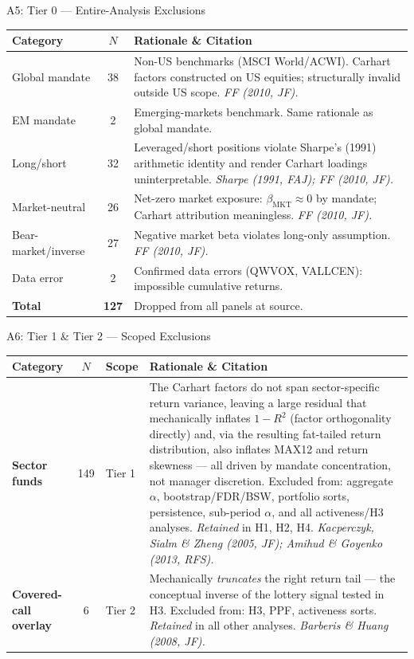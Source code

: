 \documentclass[10pt, aspectratio=169]{beamer}
\begin{document}
\begin{frame}{A5: Tier 0 — Entire-Analysis Exclusions}
  \scriptsize
  \begin{tabular}{lcp{8.2cm}}
    \toprule
    Category & $N$ & Rationale \& Citation \\
    \midrule
    Global mandate      & 38 & Non-US benchmarks (MSCI World/ACWI). Carhart factors constructed on US equities; structurally invalid outside US scope. \textit{FF (2010, JF).} \\[2pt]
    EM mandate          & 2  & Emerging-markets benchmark. Same rationale as global mandate. \\[2pt]
    Long/short          & 32 & Leveraged/short positions violate Sharpe's (1991) arithmetic identity and render Carhart loadings uninterpretable. \textit{Sharpe (1991, FAJ); FF (2010, JF).} \\[2pt]
    Market-neutral      & 26 & Net-zero market exposure: $\beta_{\text{MKT}} \approx 0$ by mandate; Carhart attribution meaningless. \textit{FF (2010, JF).} \\[2pt]
    Bear-market/inverse & 27 & Negative market beta violates long-only assumption. \textit{FF (2010, JF).} \\[2pt]
    Data error          & 2  & Confirmed data errors (QWVOX, VALLCEN): impossible cumulative returns. \\
    \midrule
    \textbf{Total}      & \textbf{127} & Dropped from all panels at source. \\
    \bottomrule
  \end{tabular}
\end{frame}

\begin{frame}{A6: Tier 1 \& Tier 2 — Scoped Exclusions}
  \scriptsize
  \begin{tabular}{lclp{6.8cm}}
    \toprule
    Category & $N$ & Scope & Rationale \& Citation \\
    \midrule
    \textbf{Sector funds}
      & 149 & Tier 1
      & The Carhart factors do not span sector-specific return variance, leaving a large residual that mechanically inflates $1-R^2$ (factor orthogonality directly) and, via the resulting fat-tailed return distribution, also inflates MAX12 and return skewness — all driven by mandate concentration, not manager discretion. Excluded from: aggregate $\alpha$, bootstrap/FDR/BSW, portfolio sorts, persistence, sub-period $\alpha$, and all activeness/H3 analyses. \emph{Retained} in H1, H2, H4. \textit{Kacperczyk, Sialm \& Zheng (2005, JF); Amihud \& Goyenko (2013, RFS).} \\[4pt]
    \textbf{Covered-call overlay}
      & 6 & Tier 2
      & Mechanically \emph{truncates} the right return tail — the conceptual inverse of the lottery signal tested in H3. Excluded from: H3, PPF, activeness sorts. \emph{Retained} in all other analyses. \textit{Barberis \& Huang (2008, JF).} \\
    \bottomrule
  \end{tabular}
\end{frame}
\end{document}
